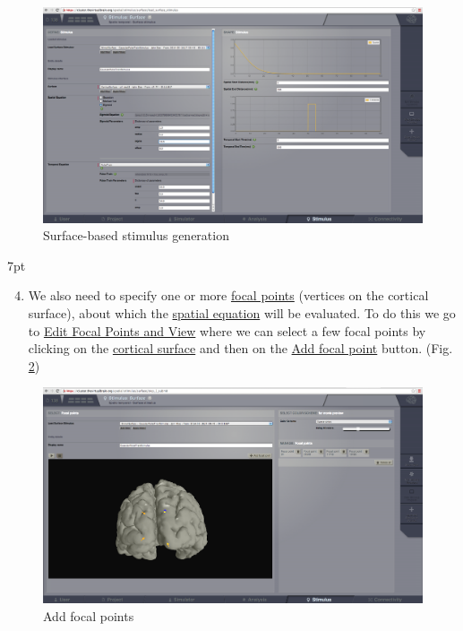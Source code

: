\documentclass{tufte-handout}
\newenvironment{formal}{%
  \def\FrameCommand{%
    \hspace{1pt}%
    {\color{DarkBlue}\vrule width 2pt}%
    {\color{formalshade}\vrule width 4pt}%
    \colorbox{formalshade}%
  }%
  \MakeFramed{\advance\hsize-\width\FrameRestore}%
  \noindent\hspace{-4.55pt}%
  \begin{adjustwidth}{}{7pt}%
  \vspace{2pt}\vspace{2pt}%
}
{%
  \vspace{2pt}\end{adjustwidth}\endMakeFramed%
}
\begin{document}
\begin{figure}[h]
  \includegraphics[width=\linewidth]{Handout_UI_HeterogenousModelAndStimulation_StimulusSurface}%
  \caption{Surface-based stimulus generation}%
  \label{fig:surface_stimulus}%
\end{figure}

\begin{formal}
\begin{enumerate}
\setcounter{enumi}{3}
\item We also need to specify one or
more \underline{focal points} (vertices on the cortical surface), about which the
\underline{spatial equation} will be evaluated. To do this we go to \underline{Edit Focal Points and View} where we can select a few focal points by clicking on the \underline{cortical surface} and then on the \underline{Add focal point} button. (Fig. \ref{fig:focal_points})
\end{enumerate}
\end{formal}

\begin{figure}[h]
  \includegraphics[width=\linewidth]{Handout_UI_HeterogenousModelAndStimulation_StimulusSurfaceFocalPoints}%
  \caption{Add focal points}%
  \label{fig:focal_points}%
\end{figure}
\end{document}

